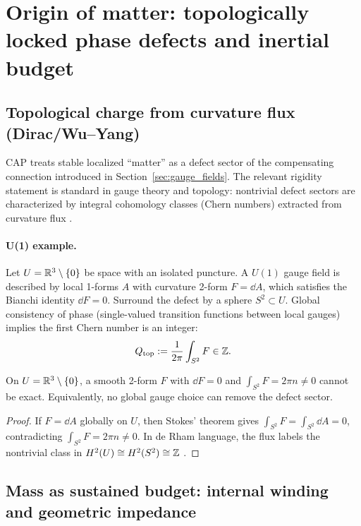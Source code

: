 \section{Origin of matter: topologically locked phase defects and inertial budget}
\label{sec:matter_defects}

\subsection{Topological charge from curvature flux (Dirac/Wu--Yang)}
\label{subsec:topo_charge}

CAP treats stable localized ``matter'' as a defect sector of the compensating connection introduced in Section~\ref{sec:gauge_fields}. The relevant rigidity statement is standard in gauge theory and topology: nontrivial defect sectors are characterized by integral cohomology classes (Chern numbers) extracted from curvature flux \cite{Dirac1931,WuYang1975,Nakahara2003,Mermin1979}.

\paragraph{U(1) example.}
Let $U=\mathbb{R}^{3}\setminus\{0\}$ be space with an isolated puncture. A $U(1)$ gauge field is described by local 1-forms $A$ with curvature 2-form $F=\dd A$, which satisfies the Bianchi identity $\dd F=0$. Surround the defect by a sphere $S^{2}\subset U$. Global consistency of phase (single-valued transition functions between local gauges) implies the first Chern number is an integer:
\begin{equation}
  Q_{\mathrm{top}}
  :=\frac{1}{2\pi}\int_{S^{2}} F
  \in \mathbb{Z}.
\end{equation}

\begin{lemma}
\label{lem:closed_not_exact}
On $U=\mathbb{R}^{3}\setminus\{0\}$, a smooth 2-form $F$ with $\dd F=0$ and $\int_{S^{2}}F=2\pi n\neq 0$ cannot be exact. Equivalently, no global gauge choice can remove the defect sector.
\end{lemma}
\begin{proof}
If $F=\dd A$ globally on $U$, then Stokes' theorem gives $\int_{S^{2}}F=\int_{S^{2}}\dd A=0$, contradicting $\int_{S^{2}}F=2\pi n\neq 0$. In de Rham language, the flux labels the nontrivial class in $H^{2}(U)\cong H^{2}(S^{2})\cong \mathbb{Z}$ \cite{Nakahara2003}.
\end{proof}

\subsection{Mass as sustained budget: internal winding and geometric impedance}
\label{subsec:mass_budget}

